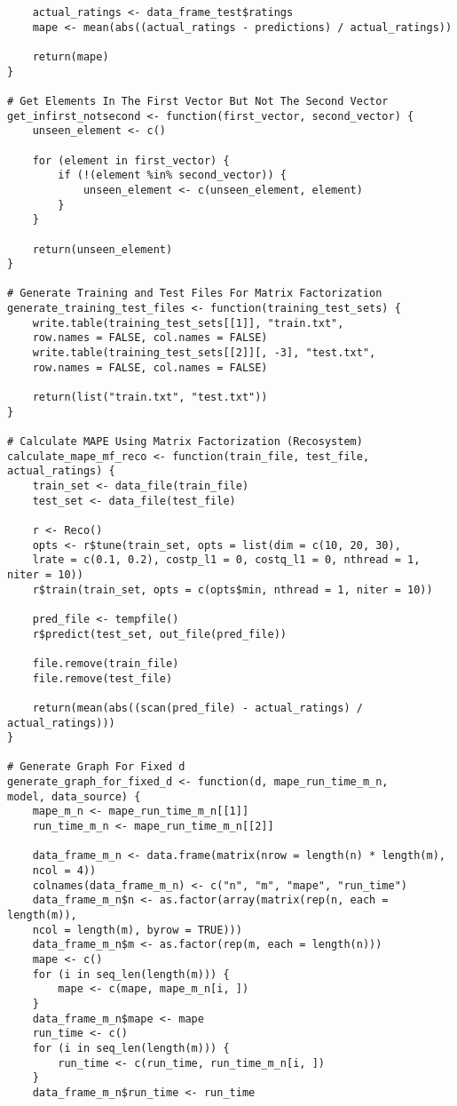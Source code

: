 \documentclass[12pt]{article}
\begin{document}
\begin{singlespace}
\begin{verbatim}
    actual_ratings <- data_frame_test$ratings
    mape <- mean(abs((actual_ratings - predictions) / actual_ratings))

    return(mape)
}

# Get Elements In The First Vector But Not The Second Vector
get_infirst_notsecond <- function(first_vector, second_vector) {
    unseen_element <- c()

    for (element in first_vector) {
        if (!(element %in% second_vector)) {
            unseen_element <- c(unseen_element, element)
        }
    }

    return(unseen_element)
}

# Generate Training and Test Files For Matrix Factorization
generate_training_test_files <- function(training_test_sets) {
    write.table(training_test_sets[[1]], "train.txt",
    row.names = FALSE, col.names = FALSE)
    write.table(training_test_sets[[2]][, -3], "test.txt",
    row.names = FALSE, col.names = FALSE)

    return(list("train.txt", "test.txt"))
}

# Calculate MAPE Using Matrix Factorization (Recosystem)
calculate_mape_mf_reco <- function(train_file, test_file, actual_ratings) {
    train_set <- data_file(train_file)
    test_set <- data_file(test_file)

    r <- Reco()
    opts <- r$tune(train_set, opts = list(dim = c(10, 20, 30),
    lrate = c(0.1, 0.2), costp_l1 = 0, costq_l1 = 0, nthread = 1, niter = 10))
    r$train(train_set, opts = c(opts$min, nthread = 1, niter = 10))

    pred_file <- tempfile()
    r$predict(test_set, out_file(pred_file))

    file.remove(train_file)
    file.remove(test_file)

    return(mean(abs((scan(pred_file) - actual_ratings) / actual_ratings)))
}

# Generate Graph For Fixed d
generate_graph_for_fixed_d <- function(d, mape_run_time_m_n,
model, data_source) {
    mape_m_n <- mape_run_time_m_n[[1]]
    run_time_m_n <- mape_run_time_m_n[[2]]

    data_frame_m_n <- data.frame(matrix(nrow = length(n) * length(m),
    ncol = 4))
    colnames(data_frame_m_n) <- c("n", "m", "mape", "run_time")
    data_frame_m_n$n <- as.factor(array(matrix(rep(n, each = length(m)),
    ncol = length(m), byrow = TRUE)))
    data_frame_m_n$m <- as.factor(rep(m, each = length(n)))
    mape <- c()
    for (i in seq_len(length(m))) {
        mape <- c(mape, mape_m_n[i, ])
    }
    data_frame_m_n$mape <- mape
    run_time <- c()
    for (i in seq_len(length(m))) {
        run_time <- c(run_time, run_time_m_n[i, ])
    }
    data_frame_m_n$run_time <- run_time


\end{verbatim}
\end{singlespace}
\end{document}
